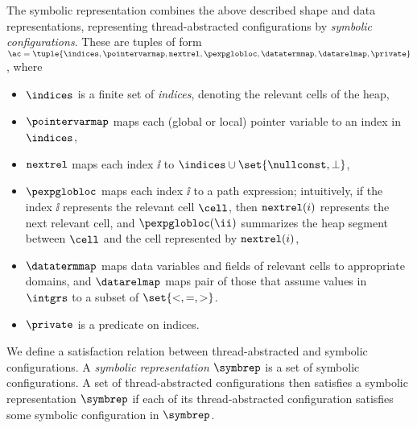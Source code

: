 The symbolic representation combines the above described shape and data
representations,  representing thread-abstracted configurations by
{\em symbolic configurations}.
These are tuples of form
$\ac = \tuple{\indices, \pointervarmap, {\tt nextrel}, \pexpglobloc, \datatermmap, \datarelmap,\private}$, where
\begin{itemize}
\item
  $\indices$ is a finite set of {\em indices}, denoting the relevant cells of the heap,
\item
  $\pointervarmap$ maps each (global or local) pointer variable to an index in $\indices$,
\item ${\tt nextrel}$ maps each index $\ii$
  to $\indices \cup \set{\nullconst,\bot}$,
\item
  $\pexpglobloc$ maps each index $\ii$ to
  a path expression;
  intuitively, if the index $\ii$ represents the relevant cell $\cell$, then
${\tt nextrel}(i)$ represents the next relevant cell, and
  $\pexpglobloc(\ii)$ summarizes  the
  heap segment between $\cell$ and the cell represented by ${\tt nextrel}(i)$,
\item
  $\datatermmap$ maps data variables and fields of relevant cells to
  appropriate domains,
  and
  $\datarelmap$ maps pair of those that assume values in $\intgrs$ to a subset of $\set{<, =, >}$.
\item
  $\private$ is a predicate on indices.
\end{itemize}
We define
a satisfaction relation between thread-abstracted and
symbolic configurations. 
A {\em symbolic representation} $\symbrep$ is a set of
symbolic configurations. 
A  set of thread-abstracted configurations then satisfies a symbolic
representation $\symbrep$ if each of its thread-abstracted
configuration satisfies some symbolic configuration in $\symbrep$.


